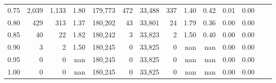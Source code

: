 \begin{tabular}{rrrrrrrrrrrrrr}
0.75 &   2,039 &  1,133 &    1.80 &  179,773 &      472 &  33,488 &     337 &  1.40 &  0.42 &  0.01 &      0.00 \\
0.80 &     429 &    313 &    1.37 &  180,202 &       43 &  33,801 &      24 &  1.79 &  0.36 &  0.00 &      0.00 \\
0.85 &      40 &     22 &    1.82 &  180,242 &        3 &  33,823 &       2 &  1.50 &  0.40 &  0.00 &      0.00 \\
0.90 &       3 &      2 &    1.50 &  180,245 &        0 &  33,825 &       0 &   nan &   nan &  0.00 &      0.00 \\
0.95 &       0 &      0 &     nan &  180,245 &        0 &  33,825 &       0 &   nan &   nan &  0.00 &      0.00 \\
1.00 &       0 &      0 &     nan &  180,245 &        0 &  33,825 &       0 &   nan &   nan &  0.00 &      0.00 \\
\bottomrule
\end{tabular}
